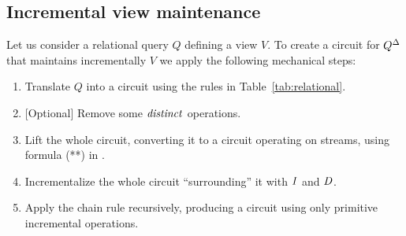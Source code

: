 %
%

\subsection{Incremental view maintenance}

Let us consider a relational query $Q$ defining a view $V$.  To create
a \dbsp circuit for ${Q}^{\Delta}$ that maintains incrementally $V$ we
apply the following mechanical steps:
%
\begin{algorithm}\label{algorithm-inc}\!
\begin{enumerate}
\item Translate $Q$ into a circuit using the rules in Table~\ref{tab:relational}.
\item{} [Optional] Remove some $\mathit{distinct}$ operations.
\item Lift the whole circuit, converting it to a circuit operating
  on streams, using formula (**) in .
\item Incrementalize the whole circuit ``surrounding'' it with $\mathit{I}$ and $\mathit{D}$.
\item Apply the chain rule recursively, producing a circuit using only
  primitive incremental operations.
\end{enumerate}
\end{algorithm}

